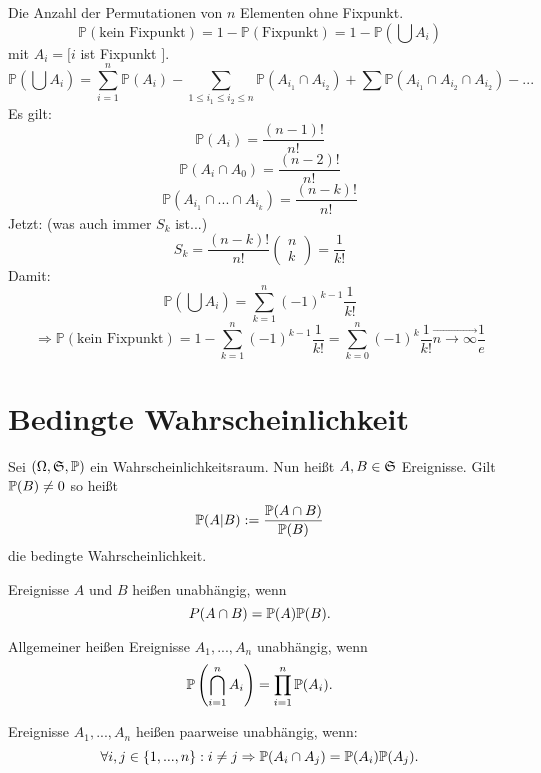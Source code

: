 			\begin{bsp}[Additionstheorem]
				Die Anzahl der Permutationen von $n$ Elementen ohne Fixpunkt. 
				\[ \mathbb{P}(\text{kein Fixpunkt})=1-\mathbb{P}(\text{Fixpunkt})=1-\mathbb{P}\left(\bigcup A_i\right) \]
				mit $A_i=[i$ ist Fixpunkt $]$. 
				\[ \mathbb{P}\left(\bigcup A_i\right)=\sum_{i=1}^n\mathbb{P}(A_i)-\sum_{1\le i_1\le i_2\le n} \mathbb{P}(A_{i_1}\cap A_{i_2})+\sum \mathbb{P}(A_{i_1}\cap A_{i_2}\cap A_{i_2})-... \]
				Es gilt:
				\[ \mathbb{P}(A_i)=\frac{(n-1)!}{n!} \]
				\[ \mathbb{P}(A_i\cap A_0)=\frac{(n-2)!}{n!} \]
				\[ \mathbb{P}(A_{i_1}\cap ... \cap A_{i_k})=\frac{(n-k)!}{n!} \]
				Jetzt: (was auch immer $S_k$ ist...)
				\[ S_k=\frac{(n-k)!}{n!} \left(\begin{array}{c} n \\ k \end{array}\right)=\frac{1}{k!} \]
				Damit:
				\[ \mathbb{P}\left(\bigcup A_i\right)=\sum_{k=1}^n (-1)^{k-1} \frac{1}{k!} \]
				\[ \Rightarrow \mathbb{P}(\text{kein Fixpunkt})=1-\sum_{k=1}^n(-1)^{k-1} \frac{1}{k!}=\sum_{k=0}^n (-1)^k \frac{1}{k!}\stackrel{\rightarrow}{n\to\infty} \frac{1}{e} \]
			\end{bsp}
			
			\section{Bedingte Wahrscheinlichkeit}
			\begin{defi}
				Sei $(\Omega, \ms{S}, \P)$ ein Wahrscheinlichkeitsraum. Nun heißt $A,B\in\ms{S}$ Ereignisse. Gilt $\P(B)\neq 0$ so heißt 
				\[ \P(A|B):=\frac{\P(A\cap B)}{\P(B)} \]
				die bedingte Wahrscheinlichkeit. 
			\end{defi}
			
			\begin{defi}
				Ereignisse $A$ und $B$ heißen unabhängig, wenn
				\[ P(A\cap B)=\P(A)\P(B). \]
			\end{defi}
			
			\begin{defi}
				Allgemeiner heißen Ereignisse $A_1,...,A_n$ unabhängig, wenn
				\[ \P\left(\bigcap_{i=1}^n A_i\right) = \prod_{i=1}^n \P(A_i). \]
			\end{defi}
			
			\begin{defi}
				Ereignisse $A_1,...,A_n$ heißen paarweise unabhängig, wenn:
				\[ \forall i,j\in\{1,...,n\}: i\neq j\Rightarrow \P(A_i\cap A_j)=\P(A_i)\P(A_j). \]
			\end{defi}
			

